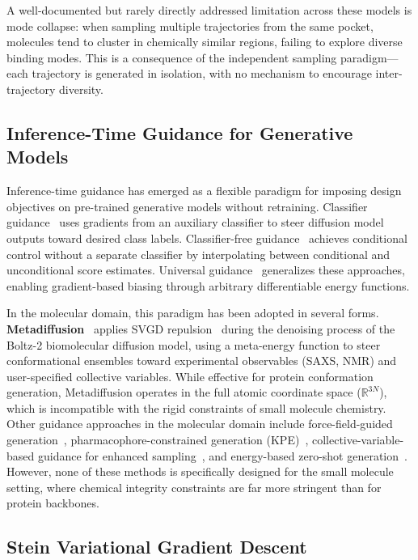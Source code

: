 \documentclass[a4paper,11pt]{article}
\begin{document}
A well-documented but rarely directly addressed limitation across these models is
mode collapse: when sampling multiple trajectories from the same pocket,
molecules tend to cluster in chemically similar regions, failing to explore
diverse binding modes.  This is a consequence of the independent sampling
paradigm---each trajectory is generated in isolation, with no mechanism to
encourage inter-trajectory diversity.

\subsection{Inference-Time Guidance for Generative Models}

Inference-time guidance has emerged as a flexible paradigm for imposing design
objectives on pre-trained generative models without retraining.  Classifier
guidance~\cite{dhariwal2021} uses gradients from an auxiliary classifier to steer
diffusion model outputs toward desired class labels.  Classifier-free
guidance~\cite{ho2022cfg} achieves conditional control without a separate
classifier by interpolating between conditional and unconditional score
estimates.  Universal guidance~\cite{bansal2023} generalizes these approaches,
enabling gradient-based biasing through arbitrary differentiable energy functions.

In the molecular domain, this paradigm has been adopted in several forms.
\textbf{Metadiffusion}~\cite{lam2026metadiffusion} applies SVGD
repulsion~\cite{liu2016svgd} during the denoising process of the Boltz-2
biomolecular diffusion model, using a meta-energy function to steer
conformational ensembles toward experimental observables (SAXS, NMR) and
user-specified collective variables.  While effective for protein conformation
generation, Metadiffusion operates in the full atomic coordinate space
($\mathbb{R}^{3N}$), which is incompatible with the rigid constraints of small
molecule chemistry.  Other guidance approaches in the molecular domain include
force-field-guided generation~\cite{lai2024force}, pharmacophore-constrained
generation (KPE)~\cite{kpe2024}, collective-variable-based guidance for enhanced
sampling~\cite{nam2025cv}, and energy-based zero-shot
generation~\cite{ebmol2024}.  However, none of these methods is specifically
designed for the small molecule setting, where chemical integrity constraints
are far more stringent than for protein backbones.

\subsection{Stein Variational Gradient Descent}
\end{document}
